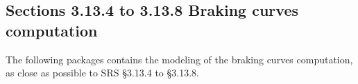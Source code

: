 \documentclass{template/openetcs_report}
\begin{document}



\subsection{Sections 3.13.4 to 3.13.8 Braking curves computation}

The following packages contains the modeling of the braking curves
computation, as close as possible to SRS §3.13.4 to §3.13.8.












\end{document}
